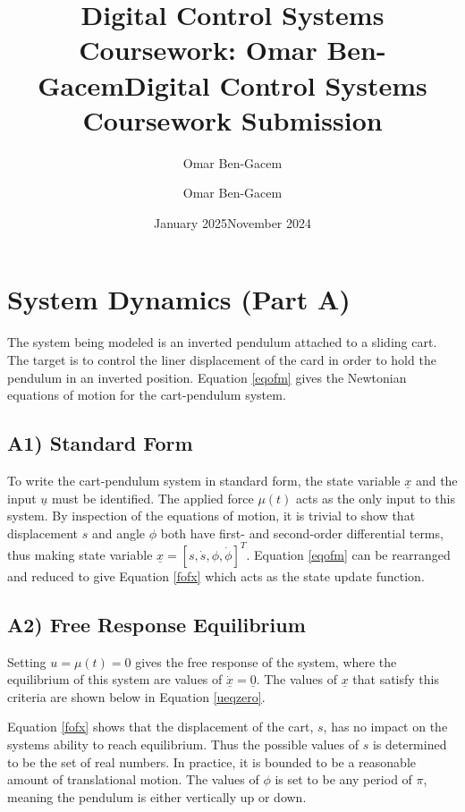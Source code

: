 \documentclass{article}
\title{Digital Control Systems Coursework: Omar Ben-Gacem}
\author{Omar Ben-Gacem}
\date{January 2025}
\title{Digital Control Systems Coursework Submission}
\author{Omar Ben-Gacem}
\date{November 2024}
\begin{document}
% 


\section{System Dynamics (Part A)}
The system being modeled is an inverted pendulum attached to a sliding cart. The target is to control the liner displacement of the card in order to hold the pendulum in an inverted position. Equation \ref{eqofm} gives the Newtonian equations of motion for the cart-pendulum system.



\subsection*{A1) Standard Form}
To write the cart-pendulum system in standard form, the state variable $\underline{x}$ and the input $\underline{u}$ must be identified. The applied force $\mu(t)$ acts as the only input to this system. By inspection of the equations of motion, it is trivial to show that displacement $s$ and angle $\phi$ both have first- and second-order differential terms, thus making state variable $\underline{x} = [s, \dot s, \phi, \dot\phi]^T$. Equation \ref{eqofm} can be rearranged and reduced to give Equation \ref{fofx} which acts as the state update function.



\subsection*{A2) Free Response Equilibrium}
Setting $u=\mu(t)=0$ gives the free response of the system, where the equilibrium of this system are values of $\underline{\dot x}=\underline{0}$. The values of $\underline{x}$ that satisfy this criteria are shown below in Equation \ref{ueqzero}.



Equation \ref{fofx} shows that the displacement of the cart, $s$, has no impact on the systems ability to reach equilibrium. Thus the possible values of $s$ is determined to be the set of real numbers. In practice, it is bounded to be a reasonable amount of translational motion. The values of $\phi$ is set to be any period of $\pi$, meaning the pendulum is either vertically up or down. 
\end{document}
